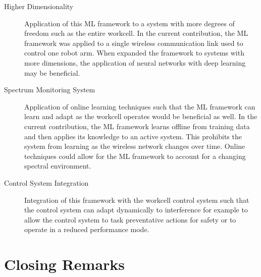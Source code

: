 \begin{description}
	
	\item[Higher Dimensionality] Application of this ML framework to a system with more degrees of freedom such as the entire workcell.  In the current contribution, the ML framework was applied to a single wireless communication link used to control one robot arm.  When expanded the framework to systems with more dimensions, the application of neural networks with deep learning may be beneficial.
	
	\item[Spectrum Monitoring System] Application of online learning techniques such that the ML framework can learn and adapt as the workcell operates would be beneficial as well.  In the current contribution, the ML framework learns offline from training data and then applies its knowledge to an active system.  This prohibits the system from learning as the wireless network changes over time.  Online techniques could allow for the ML framework to account for a changing spectral environment.
	
	\item[Control System Integration] Integration of this framework with the workcell control system such that the control system can adapt dynamically to interference for example to allow the control system to task preventative actions for safety or to operate in a reduced performance mode.
	
\end{description}

\section{Closing Remarks}

